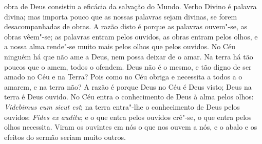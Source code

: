 obra de Deus consistiu a eficácia da salvação do Mundo. Verbo Divino é
palavra divina; mas importa pouco que as nossas palavras sejam divinas,
se forem desacompanhadas de obras. A razão disto é porque as palavras
ouvem"-se, as obras vêem"-se; as palavras entram pelos ouvidos, as obras
entram pelos olhos, e a nossa alma rende"-se muito mais pelos olhos que
pelos ouvidos. No Céu ninguém há que não ame a Deus, nem possa deixar de
o amar. Na terra há tão poucos que o amem, todos o ofendem. Deus não é o
mesmo, e tão digno de ser amado no Céu e na Terra? Pois como no Céu
obriga e necessita a todos a o amarem, e na terra não? A razão é porque
Deus no Céu é Deus visto; Deus na terra é Deus ouvido. No Céu entra o
conhecimento de Deus à alma pelos olhos: \emph{Videbimus eum sicut est};
na terra entra"-lhe o conhecimento de Deus pelos ouvidos: \emph{Fides ex
auditu}; e o que entra pelos ouvidos crê"-se, o que entra pelos olhos
necessita. Viram os ouvintes em nós o que nos ouvem a nós, e o abalo e
os efeitos do sermão seriam muito outros.

